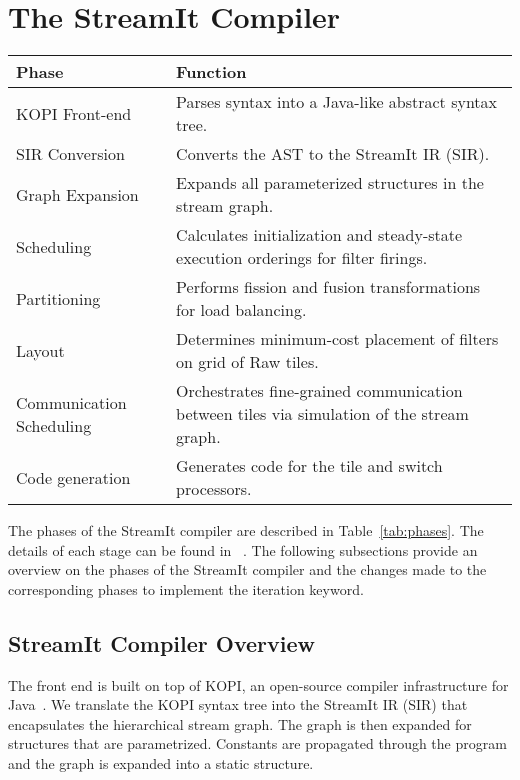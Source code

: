 \section{The StreamIt Compiler}
\label{sec:compiler}


\begin{table*}[t]
\begin{center}
\scriptsize
\begin{tabular}{|l|l|} \hline
{\bf Phase} & {\bf Function} \\
\hline \hline
KOPI Front-end & Parses syntax into a Java-like abstract syntax tree. \\
\hline
SIR Conversion & Converts the AST to the StreamIt IR (SIR). \\
\hline
Graph Expansion & Expands all parameterized structures in the stream graph. \\
\hline
Scheduling & Calculates initialization and steady-state execution orderings for filter firings. \\
\hline
Partitioning & Performs fission and fusion transformations for load balancing. \\
\hline
Layout & Determines minimum-cost placement of filters on grid of Raw tiles. \\
\hline
Communication Scheduling & Orchestrates fine-grained communication between tiles via simulation of the stream graph. \\
\hline
Code generation & Generates code for the tile and switch processors. \\
\hline
\end{tabular}
\caption{\protect\small Phases of the StreamIt compiler.
\label{tab:phases}}
\end{center}
\end{table*}

The phases of the StreamIt compiler are described in
Table~\ref{tab:phases}.  The details of each stage can be found in
~\cite{streamit-asplos}.  The following subsections provide an
overview on the phases of the StreamIt compiler and the changes made
to the corresponding phases to implement the iteration keyword.

\subsection{StreamIt Compiler Overview}
\label{sec:compiler-overview}

The front end is built on top of KOPI, an open-source compiler 
infrastructure for Java~\cite{kopi}.  We translate the KOPI syntax 
tree into the StreamIt IR (SIR) that encapsulates the hierarchical 
stream graph.  The graph is then expanded for structures that
are parametrized.  Constants are propagated through the program
and the graph is expanded into a static structure.

